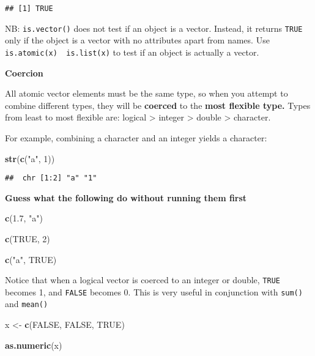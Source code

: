 \documentclass[
]{book}
\newenvironment{Shaded}{\begin{snugshade}}{\end{snugshade}}
\newcommand{\DecValTok}[1]{\textcolor[rgb]{0.00,0.00,0.81}{#1}}
\newcommand{\FloatTok}[1]{\textcolor[rgb]{0.00,0.00,0.81}{#1}}
\newcommand{\KeywordTok}[1]{\textcolor[rgb]{0.13,0.29,0.53}{\textbf{#1}}}
\newcommand{\NormalTok}[1]{#1}
\newcommand{\OtherTok}[1]{\textcolor[rgb]{0.56,0.35,0.01}{#1}}
\newcommand{\StringTok}[1]{\textcolor[rgb]{0.31,0.60,0.02}{#1}}
\begin{document}
\begin{verbatim}
## [1] TRUE
\end{verbatim}

NB: \texttt{is.vector()} does not test if an object is a vector. Instead, it returns \texttt{TRUE} only if the object is a vector with no attributes apart from names. Use \texttt{is.atomic(x)\ \textbar{}\textbar{}\ is.list(x)} to test if an object is actually a vector.

\textbf{Coercion}

All atomic vector elements must be the same type, so when you attempt to combine different types, they will be \textbf{coerced} to the \textbf{most flexible type.} Types from least to most flexible are: logical \textgreater{} integer \textgreater{} double \textgreater{} character.

For example, combining a character and an integer yields a character:

\begin{Shaded}
\begin{Highlighting}[]
\KeywordTok{str}\NormalTok{(}\KeywordTok{c}\NormalTok{(}\StringTok{"a"}\NormalTok{, }\DecValTok{1}\NormalTok{))}
\end{Highlighting}
\end{Shaded}

\begin{verbatim}
##  chr [1:2] "a" "1"
\end{verbatim}

\textbf{Guess what the following do without running them first}

\begin{Shaded}
\begin{Highlighting}[]
\KeywordTok{c}\NormalTok{(}\FloatTok{1.7}\NormalTok{, }\StringTok{"a"}\NormalTok{)}

\KeywordTok{c}\NormalTok{(}\OtherTok{TRUE}\NormalTok{, }\DecValTok{2}\NormalTok{)}

\KeywordTok{c}\NormalTok{(}\StringTok{"a"}\NormalTok{, }\OtherTok{TRUE}\NormalTok{)}
\end{Highlighting}
\end{Shaded}

Notice that when a logical vector is coerced to an integer or double, \texttt{TRUE} becomes 1, and \texttt{FALSE} becomes 0. This is very useful in conjunction with \texttt{sum()} and \texttt{mean()}

\begin{Shaded}
\begin{Highlighting}[]
\NormalTok{x \textless{}{-}}\StringTok{ }\KeywordTok{c}\NormalTok{(}\OtherTok{FALSE}\NormalTok{, }\OtherTok{FALSE}\NormalTok{, }\OtherTok{TRUE}\NormalTok{)}

\KeywordTok{as.numeric}\NormalTok{(x)}
\end{Highlighting}
\end{Shaded}
\end{document}
